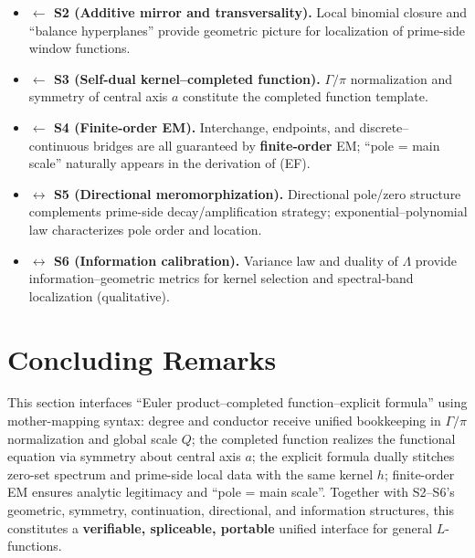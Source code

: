 \documentclass[11pt,a4paper]{article}
\theoremstyle{remark}
\begin{document}
\begin{itemize}
\item \textbf{$\leftarrow$ S2 (Additive mirror and transversality).} Local binomial closure and ``balance hyperplanes'' provide geometric picture for localization of prime-side window functions.

\item \textbf{$\leftarrow$ S3 (Self-dual kernel--completed function).} $\Gamma/\pi$ normalization and symmetry of central axis $a$ constitute the completed function template.

\item \textbf{$\leftarrow$ S4 (Finite-order EM).} Interchange, endpoints, and discrete--continuous bridges are all guaranteed by \textbf{finite-order} EM; ``pole = main scale'' naturally appears in the derivation of (EF).

\item \textbf{$\leftrightarrow$ S5 (Directional meromorphization).} Directional pole/zero structure complements prime-side decay/amplification strategy; exponential--polynomial law characterizes pole order and location.

\item \textbf{$\leftrightarrow$ S6 (Information calibration).} Variance law and duality of $\Lambda$ provide information--geometric metrics for kernel selection and spectral-band localization (qualitative).
\end{itemize}

\section*{Concluding Remarks}

This section interfaces ``Euler product--completed function--explicit formula'' using mother-mapping syntax: degree and conductor receive unified bookkeeping in $\Gamma/\pi$ normalization and global scale $Q$; the completed function realizes the functional equation via symmetry about central axis $a$; the explicit formula dually stitches zero-set spectrum and prime-side local data with the same kernel $h$; finite-order EM ensures analytic legitimacy and ``pole = main scale''. Together with S2--S6's geometric, symmetry, continuation, directional, and information structures, this constitutes a \textbf{verifiable, spliceable, portable} unified interface for general $L$-functions.
\end{document}

